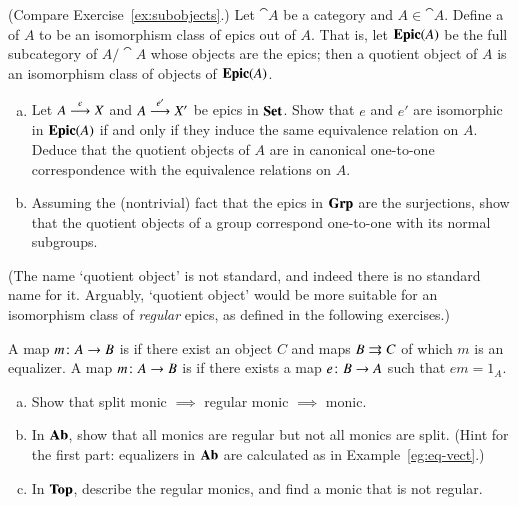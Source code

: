 \begin{question}
\label{ex:qt-objects}
(Compare Exercise~\ref{ex:subobjects}.)  Let $\cat{A}$ be a category and $A
\in \cat{A}$.  Define a  of $A$ to be an isomorphism class of epics out of $A$.  That is,
let $\mathbf{Epic}(A)$ be the full subcategory of $A/\cat{A}$ whose objects
are the epics; then a quotient object of $A$ is an isomorphism class of
objects of $\mathbf{Epic}(A)$.
%
\begin{enumerate}[(b)]
\item
Let $A \stackrel{e}{\longrightarrow} X$ and $A \stackrel{e'}{\longrightarrow} X'$ be epics in $\mathbf{Set}$.  Show that $e$
and $e'$ are isomorphic in $\mathbf{Epic}(A)$ if and only if they induce the
same equivalence%
%
%
relation on $A$.  Deduce that the quotient objects of $A$ are in canonical
one-to-one correspondence with the equivalence relations on $A$.

\item
Assuming the (nontrivial) fact that the epics in $\mathbf{Grp}$ are the
surjections, show that the quotient objects of a group correspond
one-to-one with its normal%
%
%
subgroups.
\end{enumerate}
%
(The name `quotient object' is not standard, and indeed there is no
standard name for it.  Arguably, `quotient object' would be more suitable
for an isomorphism class of \emph{regular} epics, as defined in the
following exercises.)
\end{question}


\begin{question}
\label{ex:reg-split-monic}
A map $m\from A \to B$ is  if there exist an object $C$ and maps $B \rightrightarrows C$ of which $m$
is an equalizer.  A map $m\from A \to B$ is  if there exists a map $e\from B \to A$ such that $em = 1_A$.
%
\begin{enumerate}[(b)]
\item
Show that split monic $\implies$ regular monic $\implies$ monic.

\item
In $\mathbf{Ab}$, show that all monics are regular but not all monics are split.
(Hint for the first part: equalizers in $\mathbf{Ab}$ are calculated as in
Example~\ref{eg:eq-vect}.)

\item
In $\mathbf{Top}$, describe the regular monics, and find a monic that is not
regular.
\end{enumerate}
\end{question}


